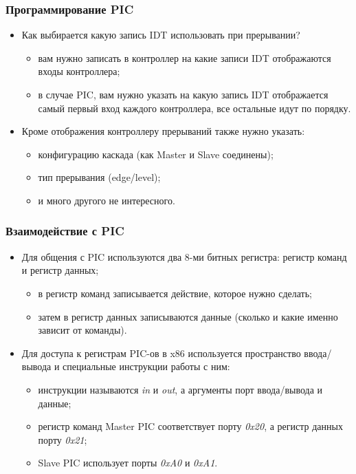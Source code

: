 \begin{frame}
\frametitle{Программирование PIC}
\begin{itemize}
  \item Как выбирается какую запись IDT использовать при прерывании?
  \begin{itemize}
    \item вам нужно записать в контроллер на какие записи IDT отображаются
    входы контроллера;
    \item в случае PIC, вам нужно указать на какую запись IDT отображается
    самый первый вход каждого контроллера, все остальные идут по порядку.
  \end{itemize}
  \item Кроме отображения контроллеру прерываний также нужно указать:
  \begin{itemize}
    \item конфигурацию каскада (как Master и Slave соединены);
    \item тип прерывания (edge/level);
    \item и много другого не интересного.
  \end{itemize}
\end{itemize}
\end{frame}

\begin{frame}
\frametitle{Взаимодействие с PIC}
\begin{itemize}
  \item Для общения с PIC используются два 8-ми битных регистра: регистр команд
  и регистр данных;
  \begin{itemize}
    \item в регистр команд записывается действие, которое нужно сделать;
    \item затем в регистр данных записываются данные (сколько и какие именно
    зависит от команды).
  \end{itemize}
  \item Для доступа к регистрам PIC-ов в x86 используется пространство
  ввода/вывода и специальные инструкции работы с ним:
  \begin{itemize}
    \item инструкции называются \emph{in} и \emph{out}, а аргументы порт
    ввода/вывода и данные;
    \item регистр команд Master PIC соответствует порту \emph{0x20}, а регистр
    данных порту \emph{0x21};
    \item Slave PIC использует порты \emph{0xA0} и \emph{0xA1}.
  \end{itemize}
\end{itemize}
\end{frame}

